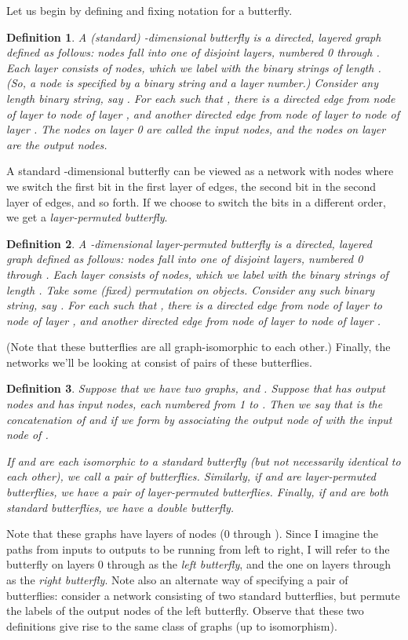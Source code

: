 \documentclass[12pt]{article}
\newtheorem{definition}{Definition}
\begin{document}
Let us begin by defining and fixing notation for a butterfly.
\begin{definition}
A \emph{(standard) -dimensional butterfly} 
is a directed, layered graph defined as follows: 
nodes fall into one of  disjoint layers, numbered 0 through . Each
layer consists of  nodes, which we label with the  binary
strings of length .  (So, a node is specified by a binary string and a
layer number.)
Consider any length  binary string, say .
For each  such that ,
there is a directed edge from node  of layer  to node 
 of layer , and 
another directed edge from node  of layer  to node 
 of layer .
The nodes on layer 0 are called the input nodes, and the nodes on layer 
 are the output nodes.
\end{definition}
A standard -dimensional butterfly can be viewed as a network with 
 nodes where we switch the first bit in the first layer
of edges, the second bit in the second layer of edges, and so forth.
If we choose to switch the bits in a different order, we get a
\emph{layer-permuted butterfly}.
\begin{definition}
A \emph{-dimensional layer-permuted butterfly} 
is a directed, layered graph defined as follows: 
nodes fall into one of  disjoint layers, numbered 0 through . Each
layer consists of  nodes, which we label with the  binary
strings of length .  Take some (fixed) permutation  on 
objects.  Consider any such binary string, say .
For each  such that ,
there is a directed edge from node  of layer  to node 
 of layer , and 
another directed edge from node  of layer  to node 
 of layer .
\end{definition}
(Note that these butterflies are all graph-isomorphic to each other.)
Finally, the networks we'll be looking at consist of pairs of these
butterflies.
\begin{definition}
Suppose that we have two graphs,  and .  Suppose that 
 has  output nodes and  has  input nodes, each
numbered from 1 to .  Then
we say that  is the \emph{concatenation} of  and  if 
we form  by associating the output node  of  with 
the input node  of .  
 
If  and  are each isomorphic to a standard butterfly
(but not necessarily identical to each other), we call  
a \emph{pair of butterflies}.  Similarly, if  and  are
layer-permuted butterflies, we have a 
\emph{pair of layer-permuted butterflies}.  Finally, if  and 
 are both standard butterflies, we have a \emph{double butterfly}.
\end{definition}
Note that these graphs have  layers of
nodes (0 through ).  Since I imagine the paths from inputs to outputs
to be running from 
left to right, I will refer to the butterfly on layers 0 through  as
the \emph{left butterfly}, and the one on layers  through  as the
\emph{right butterfly}.  Note also an alternate way of specifying
a pair of butterflies: consider a network consisting of
two standard butterflies, but permute the labels of the output nodes
of the left butterfly.  
Observe that these two definitions give rise to the same class of 
graphs (up to isomorphism).
\end{document}
